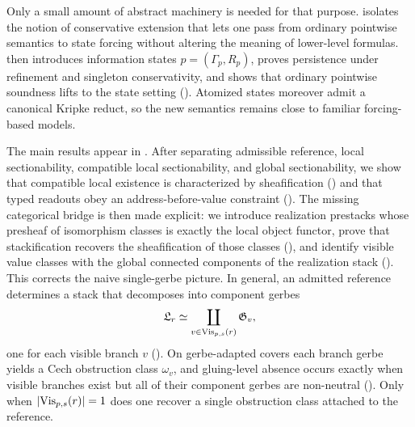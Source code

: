 Only a small amount of abstract machinery is needed for that purpose.  isolates the notion of conservative extension that lets one pass from ordinary pointwise semantics to state forcing without altering the meaning of lower-level formulas.  then introduces information states $p=(\Gamma_p,R_p)$, proves persistence under refinement and singleton conservativity, and shows that ordinary pointwise soundness lifts to the state setting (). Atomized states moreover admit a canonical Kripke reduct, so the new semantics remains close to familiar forcing-based models.

The main results appear in . After separating admissible reference, local sectionability, compatible local sectionability, and global sectionability, we show that compatible local existence is characterized by sheafification () and that typed readouts obey an address-before-value constraint (). The missing categorical bridge is then made explicit: we introduce realization prestacks whose presheaf of isomorphism classes is exactly the local object functor, prove that stackification recovers the sheafification of those classes (), and identify visible value classes with the global connected components of the realization stack (). This corrects the naive single-gerbe picture. In general, an admitted reference determines a stack that decomposes into component gerbes
\[
\mathfrak L_r\simeq \coprod_{v\in \mathrm{Vis}_{p,s}(r)} \mathfrak G_v,
\]
one for each visible branch $v$ (). On gerbe-adapted covers each branch gerbe yields a Cech obstruction class $\omega_v$, and gluing-level absence occurs exactly when visible branches exist but all of their component gerbes are non-neutral (). Only when $|\mathrm{Vis}_{p,s}(r)|=1$ does one recover a single obstruction class attached to the reference.

